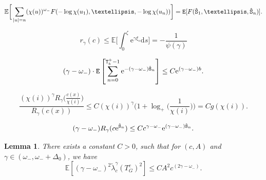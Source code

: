 \documentclass[10pt,a4paper]{amsart}
\newtheorem{lem}{Lemma}
\newcommand{\D}{\mathrm{d}}
\begin{document}
\begin{equation}
\mathbb{E}\bigg[\sum_{|u|=n} (\chi(u))^{\omega_-}F(-\log\chi(u_1), \ldots, -\log\chi(u_n))\bigg] = {\tt E}[F({\hat{\tt S}}_1, \ldots, {\hat{\tt S}}_n)].
\end{equation}

\begin{equation}\label{eq: rough bound r c}
r_{\gamma}(c)\leq \mathbb{E}\bigg[\int^{\zeta}_0 \mathrm{e}^{\gamma\xi_s}\D s \bigg] = -\frac{1}{\psi(\gamma)}
\end{equation}

\begin{equation}\label{eq: green function r.w.}
(\gamma-\omega_-)\cdot{\tt E}\left[\sum^{{\tt T}^+_b-1}_{n=0} \mathrm{e}^{-(\gamma-\omega_-){\hat{\tt S}}_n}\right]\leq C\mathrm{e}^{(\gamma-\omega_-)b}.
\end{equation}

\begin{equation}\label{eq: frac bound by g}
\frac{(\chi(i))^{\gamma}R_{\gamma}\Big(\frac{c(x)}{\chi(i)}\Big)}{R_{\gamma}(c(x))} \leq C(\chi(i))^{\gamma}\Big(1 + \log_+\Big(\frac{1}{\chi(i)}\Big)\Big) = Cg(\chi(i)).
\end{equation}

\begin{equation}\label{eq: R gamma bounds 2}
(\gamma-\omega_-)R_{\gamma}(c\mathrm{e}^{{\hat{\tt S}}_n})\leq Cc^{\gamma-\omega_-}\mathrm{e}^{(\gamma-\omega_-){\hat{\tt S}}_n}.
\end{equation}

\begin{lem}\label{lem: estimate good}
There exists a constant $C>0$, such that for $(c, A)$ and $\gamma\in(\omega_-, \omega_- + \Delta_0)$, we have
\begin{equation}
\mathbb{E}[(\gamma-\omega_-)^2\tilde{\lambda}^{\gamma}_c(T^c_G)^2]\leq CA^2c^{(2\gamma-\omega_-)}.
\end{equation}
\end{lem}
\end{document}
